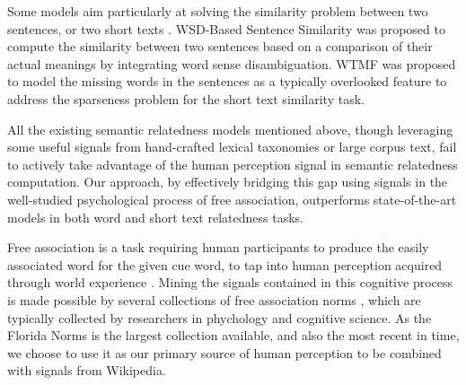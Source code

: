 Some models aim particularly at solving the similarity problem
between two sentences, or two short
texts \cite{WTMF,WTMF+PK,SPD-STS,LSA_STSS}. WSD-Based Sentence
Similarity \cite{SPD-STS} was proposed to compute the similarity
between two sentences based on a comparison of their actual meanings
by integrating word sense disambiguation. WTMF \cite{WTMF} was
proposed to model the missing words in the sentences as a typically
overlooked feature to address the sparseness problem for the short
text similarity task.

All the existing semantic relatedness models mentioned above, though
leveraging some useful signals from hand-crafted lexical taxonomies
or large corpus text, fail to actively take advantage of the human
perception signal in semantic relatedness computation. Our approach,
by effectively bridging this gap using signals in the well-studied
psychological process of free association, outperforms
state-of-the-art models in both word and short text relatedness
tasks.

Free association is a task requiring human participants to produce the
easily associated word for the given cue word, to tap into human perception acquired through
world experience \cite{Nelson:2004}.
Mining the signals contained in this cognitive process
is made possible by several collections of free association norms
 \cite{Nelson:2004,kent1910study,Minnesota,kiss1973associative},
which are typically collected by researchers in phychology and
cognitive science. As the Florida Norms is the
largest collection available, and also the most recent in time,
we choose to use it as our primary source of human perception
to be combined with signals from Wikipedia.

